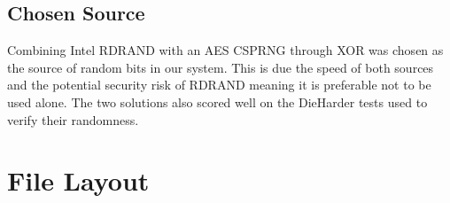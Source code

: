 \documentclass{paper}
\begin{document}
		\subsection{Chosen Source}
			Combining Intel RDRAND with an AES CSPRNG through XOR was chosen as the source of random bits in our system. This is due the speed of both sources and the potential security risk of RDRAND meaning it is preferable not to be used alone. The two solutions also scored well on the DieHarder tests used to verify their randomness.

	\newpage
		
		\section{File Layout}
						
\end{document}
